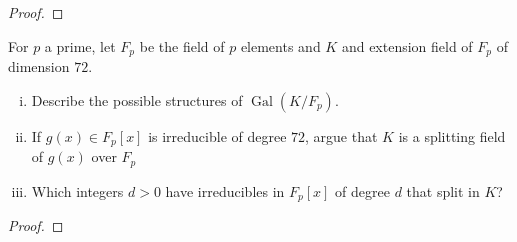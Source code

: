 \documentclass{article}
\newenvironment{problem}[2][Problem]{\begin{trivlist}
\item[\hskip \labelsep {\bfseries #1}\hskip \labelsep {\bfseries #2.}]}{\end{trivlist}}
\newcommand{\Gal}{\operatorname{Gal}}
\begin{document}
\begin{proof}
\end{proof}
\pagebreak

\begin{problem}{6}
  For $p$ a prime, let $F_p$ be the field of $p$ elements and $K$ and extension
  field of $F_p$ of dimension $72$. \begin{enumerate}[(i)]
    \item Describe the possible structures of $\Gal(K/F_p)$.
    \item If $g(x) \in F_p[x]$ is irreducible of degree $72$, argue that $K$ is
      a splitting field of $g(x)$ over $F_p$
    \item Which integers $d > 0$ have irreducibles in $F_p[x]$ of degree $d$
      that split in $K$?
  \end{enumerate}
\end{problem}

\begin{proof}
\end{proof}
\end{document}
